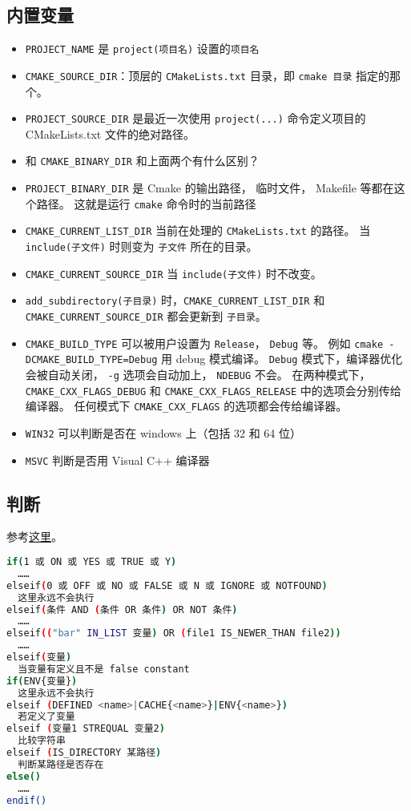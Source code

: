 \subsection{内置变量}
\begin{itemize}
\item \verb`PROJECT_NAME` 是 \verb`project(项目名)` 设置的\verb`项目名`
\item \verb`CMAKE_SOURCE_DIR`：顶层的 \verb`CMakeLists.txt` 目录，即 \verb`cmake 目录` 指定的那个。
\item \verb`PROJECT_SOURCE_DIR` 是最近一次使用 \verb`project(...)` 命令定义项目的 CMakeLists.txt 文件的绝对路径。
\item 和 \verb`CMAKE_BINARY_DIR` 和上面两个有什么区别？
\item \verb`PROJECT_BINARY_DIR` 是 Cmake 的输出路径， 临时文件， Makefile 等都在这个路径。 这就是运行 \verb`cmake` 命令时的当前路径
\item \verb`CMAKE_CURRENT_LIST_DIR` 当前在处理的 \verb`CMakeLists.txt` 的路径。 当 \verb`include(子文件)` 时则变为 \verb`子文件` 所在的目录。
\item \verb`CMAKE_CURRENT_SOURCE_DIR` 当 \verb`include(子文件)` 时不改变。
\item \verb`add_subdirectory(子目录)` 时，\verb`CMAKE_CURRENT_LIST_DIR` 和 \verb`CMAKE_CURRENT_SOURCE_DIR` 都会更新到 \verb`子目录`。
\item \verb`CMAKE_BUILD_TYPE` 可以被用户设置为 \verb`Release`， \verb`Debug` 等。 例如 \verb`cmake -DCMAKE_BUILD_TYPE=Debug` 用 debug 模式编译。 \verb`Debug` 模式下，编译器优化会被自动关闭， \verb`-g` 选项会自动加上， \verb`NDEBUG` 不会。 在两种模式下， \verb`CMAKE_CXX_FLAGS_DEBUG` 和 \verb`CMAKE_CXX_FLAGS_RELEASE` 中的选项会分别传给编译器。 任何模式下 \verb`CMAKE_CXX_FLAGS` 的选项都会传给编译器。
\item \verb`WIN32` 可以判断是否在 windows 上（包括 32 和 64 位）
\item \verb`MSVC` 判断是否用 Visual C++ 编译器
\end{itemize}

\subsection{判断}
参考\href{https://cmake.org/cmake/help/latest/command/if.html}{这里}。
\begin{lstlisting}[language=bash]
if(1 或 ON 或 YES 或 TRUE 或 Y)
  ……
elseif(0 或 OFF 或 NO 或 FALSE 或 N 或 IGNORE 或 NOTFOUND)
  这里永远不会执行
elseif(条件 AND (条件 OR 条件) OR NOT 条件)
  ……
elseif(("bar" IN_LIST 变量) OR (file1 IS_NEWER_THAN file2))
  ……
elseif(变量)
  当变量有定义且不是 false constant
if(ENV{变量})
  这里永远不会执行
elseif (DEFINED <name>|CACHE{<name>}|ENV{<name>})
  若定义了变量
elseif (变量1 STREQUAL 变量2)
  比较字符串
elseif (IS_DIRECTORY 某路径)
  判断某路径是否存在
else()
  ……
endif()
\end{lstlisting}

